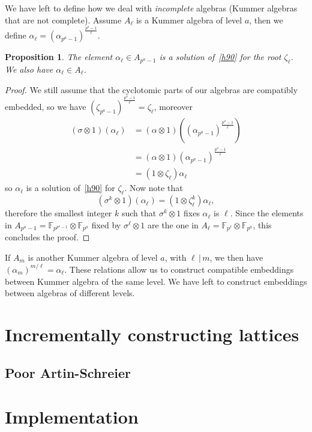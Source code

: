 \documentclass{sig-alternate}
\newtheorem{proposition}{Proposition}
\begin{document}
We have left to define how we deal with \emph{incomplete} algebras (Kummer
algebras that are not complete). Assume $A_\ell$ is a Kummer algebra of level
$a$, then we define $\alpha_\ell = (\alpha_{p^a-1})^{\frac{p^a-1}{\ell}}$.
\begin{proposition}
  The element $\alpha_\ell\in A_{p^a-1}$ is a solution of~\eqref{h90} for the
  root $\zeta_\ell$. We also have $\alpha_\ell\in A_\ell$.
\end{proposition}
\begin{proof}
We still assume that the cyclotomic parts of our algebras are compatibly
embedded, so we have $(\zeta_{p^a-1})^{\frac{p^a-1}{\ell}} = \zeta_\ell$,
moreover
\begin{align*}
  (\sigma\otimes1)(\alpha_\ell) &=
  (\alpha\otimes1)((\alpha_{p^a-1})^{\frac{p^a-1}{\ell}}) \\
  &= (\alpha\otimes1)(\alpha_{p^a-1})^{\frac{p^a-1}{\ell}} \\
  &= (1\otimes\zeta_\ell)\alpha_\ell
\end{align*}
so $\alpha_\ell$ is a solution of~\eqref{h90} for $\zeta_\ell$. Now note that 
\[
  (\sigma^k\otimes1)(\alpha_\ell) = (1\otimes\zeta_\ell^k)\alpha_\ell,
\]
therefore the smallest integer $k$ such that $\sigma^k\otimes1$ fixes
$\alpha_\ell$ is $\ell$. Since the elements in
$A_{p^a-1}=\mathbb{F}_{p^{p^a-1}}\otimes\mathbb{F}_{p^a}$ fixed by
$\sigma^\ell\otimes1$ are the one in
$A_\ell = \mathbb{F}_{p^\ell}\otimes\mathbb{F}_{p^a}$, this concludes the
proof.
\end{proof}
If $A_m$ is another Kummer algebra of level $a$, with $\ell\,|\,m$, we then have
$(\alpha_m)^{m/\ell} = \alpha_\ell$. These relations allow us to construct
compatible embeddings between Kummer algebra of the same level. We have left to
construct embeddings between algebras of different levels.


\section{Incrementally constructing lattices}
\label{sec:construction}

\subsection{Poor Artin-Schreier}


\section{Implementation}
\label{sec:implementation}



\end{document}
